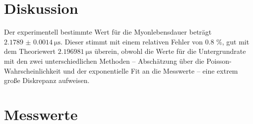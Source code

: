 \section{Diskussion}
Der experimentell bestimmte Wert für die Myonlebensdauer beträgt $\SI[separate-uncertainty=true]{2.1789(14)}{\micro\second}$. Dieser stimmt mit einem relativen Fehler von 0.8 \%, gut mit dem Theoriewert $\SI{2.196981}{\micro\second}$ \cite{PDG} überein, obwohl die Werte für die Untergrundrate mit den zwei unterschiedlichen Methoden -- Abschätzung über die Poisson-Wahrscheinlichkeit und der exponentielle Fit an die Messwerte -- eine extrem große Diskrepanz aufweisen.

\printbibliography

\newpage
\section{Messwerte}


